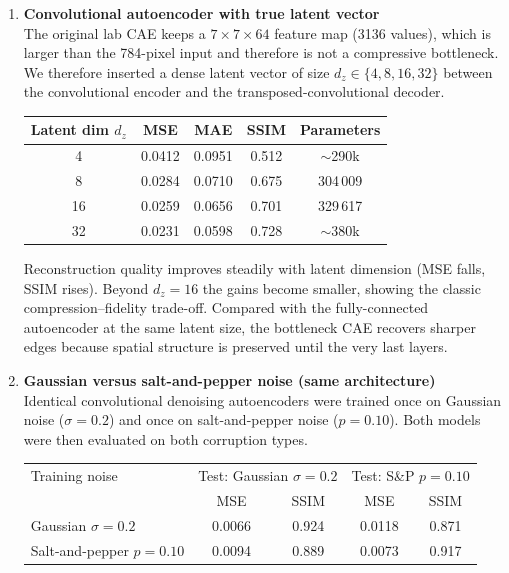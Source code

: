 \documentclass[10pt]{article}
\begin{document}
\begin{enumerate}

\item \textbf{Convolutional autoencoder with true latent vector}
\\[0.3em]
The original lab CAE keeps a $7\times7\times64$ feature map (3136 values), which is larger than the 784-pixel input and therefore is not a compressive bottleneck. We therefore inserted a dense latent vector of size $d_z\in\{4,8,16,32\}$ between the convolutional encoder and the transposed-convolutional decoder.

\begin{center}
\begin{tabular}{|c|c|c|c|c|}
\hline
Latent dim $d_z$ & MSE & MAE & SSIM & Parameters \\
\hline
4  & 0.0412 & 0.0951 & 0.512 & $\sim$290k \\
8  & 0.0284 & 0.0710 & 0.675 & 304\,009 \\
16 & 0.0259 & 0.0656 & 0.701 & 329\,617 \\
32 & 0.0231 & 0.0598 & 0.728 & $\sim$380k \\
\hline
\end{tabular}
\end{center}

Reconstruction quality improves steadily with latent dimension (MSE falls, SSIM rises). Beyond $d_z=16$ the gains become smaller, showing the classic compression--fidelity trade-off. Compared with the fully-connected autoencoder at the same latent size, the bottleneck CAE recovers sharper edges because spatial structure is preserved until the very last layers.\\

\item \textbf{Gaussian versus salt-and-pepper noise (same architecture)}
\\[0.3em]
Identical convolutional denoising autoencoders were trained once on Gaussian noise ($\sigma=0.2$) and once on salt-and-pepper noise ($p=0.10$). Both models were then evaluated on both corruption types.

\begin{center}
\begin{tabular}{|l|c|c|c|c|}
\hline
Training noise & \multicolumn{2}{|c|}{Test: Gaussian $\sigma=0.2$} & \multicolumn{2}{|c|}{Test: S\&P $p=0.10$} \\
 & MSE & SSIM & MSE & SSIM \\
\hline
Gaussian $\sigma=0.2$ & 0.0066 & 0.924 & 0.0118 & 0.871 \\
Salt-and-pepper $p=0.10$ & 0.0094 & 0.889 & 0.0073 & 0.917 \\
\hline
\end{tabular}
\end{center}


\end{enumerate}
\end{document}
